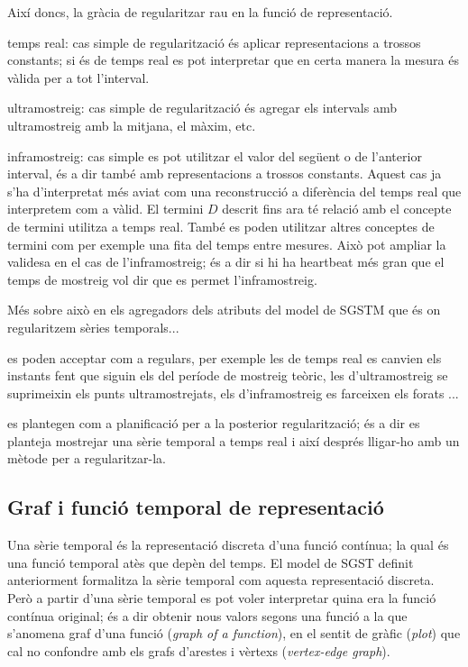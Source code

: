 Així doncs, la gràcia de regularitzar rau en la funció de representació.



temps real: cas simple de regularització és aplicar representacions a trossos constants; si és de temps real es pot interpretar que en certa manera la mesura és vàlida per a tot l'interval.

ultramostreig: cas simple de regularització és agregar els intervals amb ultramostreig amb la mitjana, el màxim, etc.

inframostreig: cas simple es pot utilitzar el valor del següent o de l'anterior interval, és a dir també amb representacions a trossos constants. Aquest cas ja s'ha d'interpretat més aviat com una reconstrucció a diferència del temps real que interpretem com a vàlid.
El termini $D$ descrit fins ara té relació amb el concepte de termini utilitza a temps real. També es poden utilitzar altres conceptes de termini com per exemple una fita del temps entre mesures. Això pot ampliar la validesa en el cas de l'inframostreig; és a dir si hi ha heartbeat més gran que el temps de mostreig vol dir que es permet l'inframostreig.



Més sobre això en els agregadors dels atributs del model de SGSTM que és on regularitzem sèries temporals...


es poden acceptar com a regulars, per exemple les de temps real es canvien els instants fent que siguin els del període de mostreig teòric, les d'ultramostreig se suprimeixin els punts ultramostrejats, els d'inframostreig es farceixen els forats ...

es plantegen com a planificació per a la posterior regularització; és a dir es planteja mostrejar una sèrie temporal a temps real i així després lligar-ho amb un mètode per a regularitzar-la.



\subsection{Graf i funció temporal de representació}
\label{sec:model:repr}

Una sèrie temporal és la representació discreta d'una funció contínua;
la qual és una funció temporal atès que depèn del temps. El model de
SGST definit anteriorment formalitza la sèrie temporal com aquesta
representació discreta. Però a partir d'una sèrie temporal es pot
voler interpretar quina era la funció contínua original; és a dir
obtenir nous valors segons una funció a la que s'anomena graf d'una
funció (\emph{graph of a function}), en el sentit de gràfic
(\emph{plot}) que cal no confondre amb els grafs d'arestes i vèrtexs
(\emph{vertex-edge graph}).

